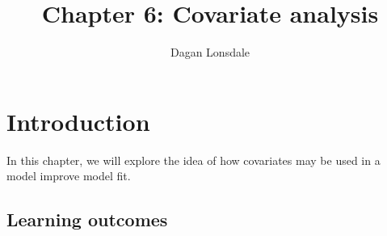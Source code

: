 \documentclass[
]{article}
\title{Chapter 6: Covariate analysis}
\author{Dagan Lonsdale}
\date{}
\begin{document}
\maketitle

{
\hypersetup{linkcolor=}
\setcounter{tocdepth}{2}
\tableofcontents
}
\newpage

\section{Introduction}\label{introduction}

In this chapter, we will explore the idea of how covariates may be used in a model improve model fit.

\subsection{Learning outcomes}\label{learning-outcomes}
\end{document}
